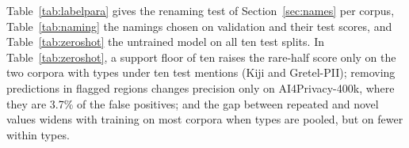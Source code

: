 \documentclass[11pt]{article}
\begin{document}
Table~\ref{tab:labelpara} gives the renaming test of
Section~\ref{sec:names} per corpus, Table~\ref{tab:naming} the namings
chosen on validation and their test scores, and Table~\ref{tab:zeroshot}
the untrained model on all ten test splits. In Table~\ref{tab:zeroshot}, a
support floor of ten raises the rare-half score only on the two corpora
with types under ten test mentions (Kiji and Gretel-PII); removing
predictions in flagged regions changes precision only on
AI4Privacy-400k, where they are 3.7\% of the false positives; and the
gap between repeated and novel values widens with training on most
corpora when types are pooled, but on fewer within types.

\begin{table}[h]
\centering
\small
\setlength{\tabcolsep}{3pt}
\caption{Renaming each type to its description at test time (rare-half
macro-F1 on the corpus's test split). DiD: trained $\Delta$ minus
untrained $\Delta$.}
\label{tab:labelpara}
\end{table}

\begin{table}[h]
\centering
\small
\setlength{\tabcolsep}{2.5pt}
\caption{Type names chosen on validation (original, lower case with
spaces, or description), scored on test: rare-half macro-F1 with the
original names and with the chosen ones.}
\label{tab:naming}
\end{table}
\end{document}
